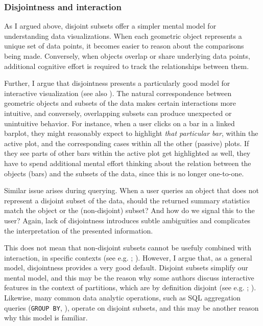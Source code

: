 \documentclass[
]{book}
\theoremstyle{definition}
\theoremstyle{definition}
\theoremstyle{definition}
\theoremstyle{definition}
\theoremstyle{remark}
\begin{document}
\subsubsection{Disjointness and interaction}\label{disjointness-and-interaction}

As I argued above, disjoint subsets offer a simpler mental model for understanding data visualizations. When each geometric object represents a unique set of data points, it becomes easier to reason about the comparisons being made. Conversely, when objects overlap or share underlying data points, additional cognitive effort is required to track the relationships between them.

Further, I argue that disjointness presents a particularly good model for interactive visualization (see also ). The natural correspondence between geometric objects and subsets of the data makes certain interactions more intuitive, and conversely, overlapping subsets can produce unexpected or unintuitive behavior. For instance, when a user clicks on a bar in a linked barplot, they might reasonably expect to highlight \emph{that particular bar}, within the active plot, and the corresponding cases within all the other (passive) plots. If they see parts of other bars within the active plot get highlighted as well, they have to spend additional mental effort thinking about the relation between the objects (bars) and the subsets of the data, since this is no longer one-to-one.

Similar issue arises during querying. When a user queries an object that does not represent a disjoint subset of the data, should the returned summary statistics match the object or the (non-disjoint) subset? And how do we signal this to the user? Again, lack of disjointness introduces subtle ambiguities and complicates the interpretation of the presented information.

This does not mean that non-disjoint subsets cannot be usefuly combined with interaction, in specific contexts (see e.g. ; ). However, I argue that, as a general model, disjointness provides a very good default. Disjoint subsets simplify our mental model, and this may be the reason why some authors discuss interactive features in the context of partitions, which are by definition disjoint (see e.g. ; ). Likewise, many common data analytic operations, such as SQL aggregation queries (\texttt{GROUP\ BY}, ), operate on disjoint subsets, and this may be another reason why this model is familiar.
\end{document}
